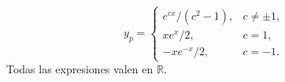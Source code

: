 \[y_p=\begin{cases}e^{cx}/(c^2-1),&c\ne\pm1,\\ xe^x/2,&c=1,\\-xe^{-x}/2,&c=-1.\end{cases}\] Todas las expresiones valen en \(\mathbb R\).
